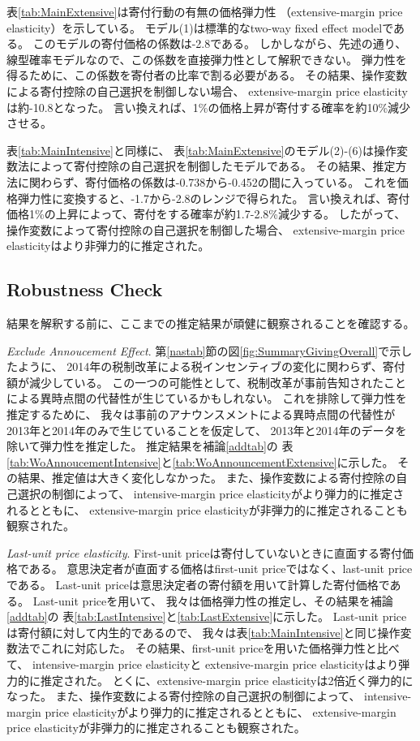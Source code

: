 \documentclass[
  11pt,
  a4paper,
]{article}
\begin{document}
表\ref{tab:MainExtensive}は寄付行動の有無の価格弾力性
（extensive-margin price elasticity）を示している。
モデル(1)は標準的なtwo-way fixed effect modelである。
このモデルの寄付価格の係数は-2.8である。
しかしながら、先述の通り、
線型確率モデルなので、この係数を直接弾力性として解釈できない。
弾力性を得るために、この係数を寄付者の比率で割る必要がある。
その結果、操作変数による寄付控除の自己選択を制御しない場合、
extensive-margin price elasticityは約-10.8となった。
言い換えれば、1\%の価格上昇が寄付する確率を約10\%減少させる。

表\ref{tab:MainIntensive}と同様に、
表\ref{tab:MainExtensive}のモデル(2)-(6)は操作変数法によって寄付控除の自己選択を制御したモデルである。
その結果、推定方法に関わらず、寄付価格の係数は-0.738から-0.452の間に入っている。
これを価格弾力性に変換すると、-1.7から-2.8のレンジで得られた。
言い換えれば、寄付価格1\%の上昇によって、寄付をする確率が約1.7-2.8\%減少する。
したがって、操作変数によって寄付控除の自己選択を制御した場合、
extensive-margin price elasticityはより非弾力的に推定された。

\hypertarget{robustness-check}{%
\subsection{Robustness Check}\label{robustness-check}}

結果を解釈する前に、ここまでの推定結果が頑健に観察されることを確認する。

\noindent
\emph{Exclude Annoucement Effect}.
第\ref{nastab}節の図\ref{fig:SummaryGivingOverall}で示したように、
2014年の税制改革による税インセンティブの変化に関わらず、寄付額が減少している。
この一つの可能性として、税制改革が事前告知されたことによる異時点間の代替性が生じているかもしれない。
これを排除して弾力性を推定するために、
我々は事前のアナウンスメントによる異時点間の代替性が2013年と2014年のみで生じていることを仮定して、
2013年と2014年のデータを除いて弾力性を推定した。
推定結果を補論\ref{addtab}の
表\ref{tab:WoAnnoucementIntensive}と\ref{tab:WoAnnouncementExtensive}に示した。
その結果、推定値は大きく変化しなかった。
また、操作変数による寄付控除の自己選択の制御によって、
intensive-margin price elasticityがより弾力的に推定されるとともに、
extensive-margin price elasticityが非弾力的に推定されることも観察された。

\noindent
\emph{Last-unit price elasticity}.
First-unit priceは寄付していないときに直面する寄付価格である。
意思決定者が直面する価格はfirst-unit priceではなく、last-unit priceである。
Last-unit priceは意思決定者の寄付額を用いて計算した寄付価格である。
Last-unit priceを用いて、
我々は価格弾力性の推定し、その結果を補論\ref{addtab}の
表\ref{tab:LastIntensive}と\ref{tab:LastExtensive}に示した。
Last-unit priceは寄付額に対して内生的であるので、
我々は表\ref{tab:MainIntensive}と同じ操作変数法でこれに対応した。
その結果、first-unit priceを用いた価格弾力性と比べて、
intensive-margin price elasticityと
extensive-margin price elasticityはより弾力的に推定された。
とくに、extensive-margin price elasticityは2倍近く弾力的になった。
また、操作変数による寄付控除の自己選択の制御によって、
intensive-margin price elasticityがより弾力的に推定されるとともに、
extensive-margin price elasticityが非弾力的に推定されることも観察された。
\end{document}
